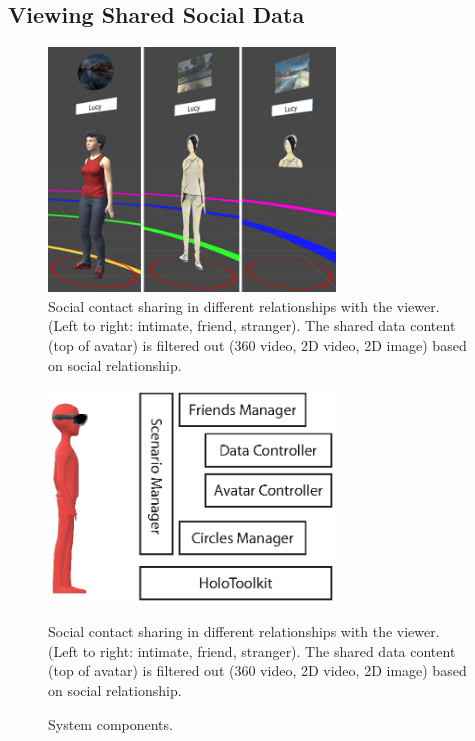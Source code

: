 \subsection{Viewing Shared Social Data}


\begin{figure}[ht]
	\centering
	\includegraphics[width=3in]{images/chi/3_levels_of_data.png}
	\caption{Social contact sharing in different relationships with the viewer. (Left to right: intimate, friend, stranger). The shared data content (top of avatar) is filtered out (360 video, 2D video, 2D image) based on social relationship.}
  	\label{fig:data:viewer}
\end{figure}

\begin{figure}[ht]
	\centering
	\includegraphics[width=3in]{images/chi/images-03.eps}
	\caption{Social contact sharing in different relationships with the viewer. (Left to right: intimate, friend, stranger). The shared data content (top of avatar) is filtered out (360 video, 2D video, 2D image) based on social relationship.}
  	\caption{System components.}
  	\label{fig:data:system}
\end{figure}


